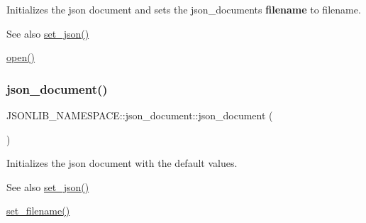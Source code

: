 Initializes the json document and sets the json\+\_\+documents {\bfseries filename} to {\ttfamily filename}. 

\begin{DoxySeeAlso}{See also}
\hyperlink{classJSONLIB__NAMESPACE_1_1json__document_a5a72e4dc0b37b95c70baefad930b5b71}{set\+\_\+json()} 

\hyperlink{classJSONLIB__NAMESPACE_1_1json__document_a08e509059e628742f35716dddce2d740}{open()} 
\end{DoxySeeAlso}
\mbox{\label{classJSONLIB__NAMESPACE_1_1json__document_acf256862749f93052ab0a5ad54272c3e}} 
\subsubsection{\texorpdfstring{json\+\_\+document()}{json\_document()}\hspace{0.1cm}{\footnotesize\ttfamily [3/6]}}
{\footnotesize\ttfamily J\+S\+O\+N\+L\+I\+B\+\_\+\+N\+A\+M\+E\+S\+P\+A\+C\+E\+::json\+\_\+document\+::json\+\_\+document (\begin{DoxyParamCaption}{ }\end{DoxyParamCaption})}



Initializes the json document with the default values. 

\begin{DoxySeeAlso}{See also}
\hyperlink{classJSONLIB__NAMESPACE_1_1json__document_a5a72e4dc0b37b95c70baefad930b5b71}{set\+\_\+json()} 

\hyperlink{classJSONLIB__NAMESPACE_1_1json__document_acc406344661e361c75ac7bc307057712}{set\+\_\+filename()} 
\end{DoxySeeAlso}
\mbox{\label{classJSONLIB__NAMESPACE_1_1json__document_abf4e22f3453ec9856f58a202dae0c836}} 
